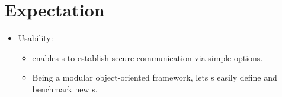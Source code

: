 \section{Expectation}

\begin{itemize}
\item Usability:
  \begin{itemize}
  \item \cry{} enables \eu s to establish
    secure communication via simple \cl{} options.
  \item Being a modular object-oriented framework,
    \cry{} lets \cg s easily define and benchmark new \cs s.
  \end{itemize}
\end{itemize}
